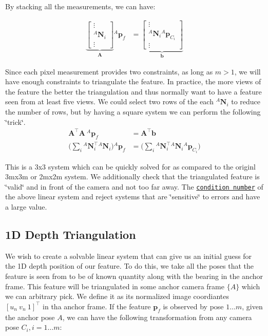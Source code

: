 By stacking all the measurements, we can have\+:

\begin{align*} \underbrace{ \begin{bmatrix} \vdots \\ {}^{A}\mathbf{N}_i \\ \vdots \end{bmatrix} }_{\mathbf{A}} {}^A\mathbf{p}_f & = \underbrace{ \begin{bmatrix} \vdots \\ {}^{A}\mathbf{N}_i {}^A\mathbf{p}_{C_i} \\ \vdots \end{bmatrix} }_{\mathbf{b}} \end{align*}

Since each pixel measurement provides two constraints, as long as $m>1$, we will have enough constraints to triangulate the feature. In practice, the more views of the feature the better the triangulation and thus normally want to have a feature seen from at least five views. We could select two rows of the each ${}^{A}\mathbf{N}_i$ to reduce the number of rows, but by having a square system we can perform the following \char`\"{}trick\char`\"{}. \begin{align*} \mathbf{A}^\top\mathbf{A}~ {}^A\mathbf{p}_f &= \mathbf{A}^\top\mathbf{b} \\ \Big( \sum_i {}^{A}\mathbf{N}_i^\top {}^{A}\mathbf{N}_i \Big) {}^A\mathbf{p}_f &= \Big( \sum_i {}^{A}\mathbf{N}_i^\top {}^{A}\mathbf{N}_i {}^A\mathbf{p}_{C_i} \Big) \end{align*}

This is a 3x3 system which can be quickly solved for as compared to the originl 3mx3m or 2mx2m system. We additionally check that the triangulated feature is \char`\"{}valid\char`\"{} and in front of the camera and not too far away. The \href{https://en.wikipedia.org/wiki/Condition_number}{\tt condition number} of the above linear system and reject systems that are \char`\"{}sensitive\char`\"{} to errors and have a large value.\hypertarget{update-featinit_featinit-linear-1d}{}\subsection{1\+D Depth Triangulation}\label{update-featinit_featinit-linear-1d}
We wish to create a solvable linear system that can give us an initial guess for the 1D depth position of our feature. To do this, we take all the poses that the feature is seen from to be of known quantity along with the bearing in the anchor frame. This feature will be triangulated in some anchor camera frame $\{A\}$ which we can arbitrary pick. We define it as its normalized image coordiantes $[u_n ~ v_n ~ 1]^\top$ in tha anchor frame. If the feature $\mathbf{p}_f$ is observed by pose $1\ldots m$, given the anchor pose $A$, we can have the following transformation from any camera pose $C_i, i=1\ldots m$\+:

